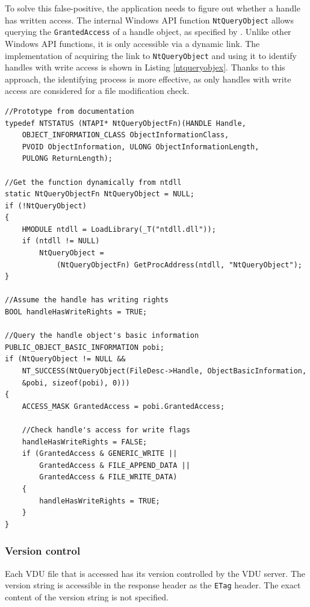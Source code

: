 To solve this false-positive, the application needs to figure out whether a handle has written access. The internal Windows API function \lstinline{NtQueryObject} allows querying the \lstinline{GrantedAccess} of a handle object, as specified by \cite{WinNtQuery}. Unlike other Windows API functions, it is only accessible via a dynamic link. The implementation of acquiring the link to \lstinline{NtQueryObject} and using it to identify handles with write access is shown in Listing \ref{ntqueryobjex}. Thanks to this approach, the identifying process is more effective, as only handles with write access are considered for a file modification check.
\begin{lstlisting}[caption={Implementation of accessing NtQueryObject function and using it to identify wheter the handle has access to writing.}, label=ntqueryobjex]
//Prototype from documentation
typedef NTSTATUS (NTAPI* NtQueryObjectFn)(HANDLE Handle,
    OBJECT_INFORMATION_CLASS ObjectInformationClass, 
    PVOID ObjectInformation, ULONG ObjectInformationLength,
    PULONG ReturnLength);

//Get the function dynamically from ntdll
static NtQueryObjectFn NtQueryObject = NULL;
if (!NtQueryObject)
{
    HMODULE ntdll = LoadLibrary(_T("ntdll.dll"));
    if (ntdll != NULL)
        NtQueryObject = 
            (NtQueryObjectFn) GetProcAddress(ntdll, "NtQueryObject");
}

//Assume the handle has writing rights
BOOL handleHasWriteRights = TRUE;

//Query the handle object's basic information
PUBLIC_OBJECT_BASIC_INFORMATION pobi;
if (NtQueryObject != NULL && 
    NT_SUCCESS(NtQueryObject(FileDesc->Handle, ObjectBasicInformation,
    &pobi, sizeof(pobi), 0)))
{
    ACCESS_MASK GrantedAccess = pobi.GrantedAccess;
    
    //Check handle's access for write flags
    handleHasWriteRights = FALSE;
    if (GrantedAccess & GENERIC_WRITE ||
        GrantedAccess & FILE_APPEND_DATA ||
        GrantedAccess & FILE_WRITE_DATA)
    {
        handleHasWriteRights = TRUE;
    }
}
\end{lstlisting}

\subsubsection{Version control}
Each VDU file that is accessed has its version controlled by the VDU server. The version string is accessible in the response header as the \lstinline{ETag} header. The exact content of the version string is not specified.


